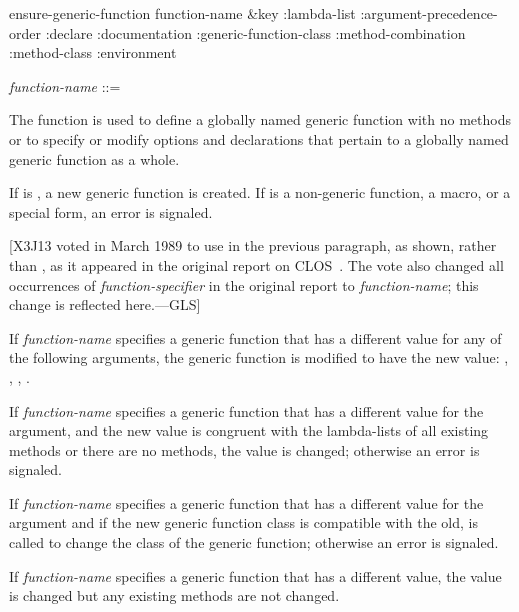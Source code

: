 \begin{defun}[Function]
ensure-generic-function function-name &key :lambda-list
:argument-precedence-order
:declare
:documentation
:generic-function-class
:method-combination
:method-class
:environment

\begin{tabbing}
\emph{function-name\/} ::= 
\end{tabbing}
The function  is used to define a
globally named generic function with no methods or to specify or
modify options and declarations that pertain to a globally named
generic function as a whole.

If  is , a new
generic function is created.  If  is a non-generic function, a macro, or a
special form, an error is signaled.

[X3J13 voted in March 1989  to use 
in the previous paragraph, as shown, rather than ,
as it appeared in the original report on CLOS~\cite{SIGPLAN-CLOS,LASC-CLOS-PART-2}.
The vote also changed all occurrences of \emph{function-specifier} in the
original report to \emph{function-name}; this change is reflected here.---GLS]

If \emph{function-name\/} specifies a generic function that has a
different value for any of the following arguments, the generic
function is modified to have the new value: 
, , ,
.

If \emph{function-name\/} specifies a generic function that has a
different value for the  argument, and the new value
is congruent with the lambda-lists of all existing methods or there
are no methods, the value is changed; otherwise an error is signaled.

If \emph{function-name\/} specifies a generic function that has a
different value for the  argument and if
the new generic function class is compatible with the old, 
 is called to change the class of the generic function;
otherwise an error is signaled.

If \emph{function-name\/} specifies a generic function that has a
different  value, the value is
changed but any existing methods are not changed.





\end{defun}
